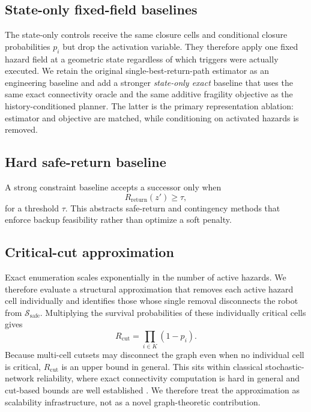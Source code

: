 \documentclass[conference]{IEEEtran}
\newcommand{\Rret}{R_{\mathrm{return}}}
\newcommand{\Ssafe}{\mathcal{S}_{\mathrm{safe}}}
\begin{document}
\subsection{State-only fixed-field baselines}
The state-only controls receive the same closure cells and conditional closure probabilities $p_i$ but drop the activation variable. They therefore apply one fixed hazard field at a geometric state regardless of which triggers were actually executed. We retain the original single-best-return-path estimator as an engineering baseline and add a stronger \emph{state-only exact} baseline that uses the same exact connectivity oracle and the same additive fragility objective as the history-conditioned planner. The latter is the primary representation ablation: estimator and objective are matched, while conditioning on activated hazards is removed.

\subsection{Hard safe-return baseline}
A strong constraint baseline accepts a successor only when
\begin{equation}
\Rret(z')\geq\tau,
\end{equation}
for a threshold $\tau$. This abstracts safe-return and contingency methods that enforce backup feasibility rather than optimize a soft penalty.

\subsection{Critical-cut approximation}
Exact enumeration scales exponentially in the number of active hazards. We therefore evaluate a structural approximation that removes each active hazard cell individually and identifies those whose single removal disconnects the robot from $\Ssafe$. Multiplying the survival probabilities of these individually critical cells gives
\begin{equation}
R_{\mathrm{cut}}=\prod_{i\in K}(1-p_i).
\end{equation}
Because multi-cell cutsets may disconnect the graph even when no individual cell is critical, $R_{\mathrm{cut}}$ is an upper bound in general. This sits within classical stochastic-network reliability, where exact connectivity computation is hard in general and cut-based bounds are well established \cite{provan1983reliability,ball1983networkreliability}. We therefore treat the approximation as scalability infrastructure, not as a novel graph-theoretic contribution.
\end{document}
